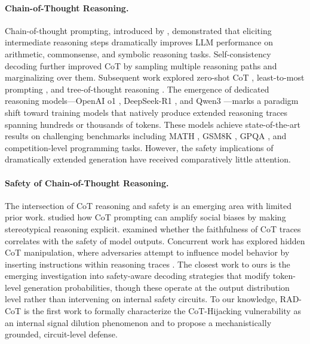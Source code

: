 \documentclass[11pt]{article}
\begin{document}
\paragraph{Chain-of-Thought Reasoning.}
Chain-of-thought prompting, introduced by \citet{wei2022chain}, demonstrated that eliciting intermediate reasoning steps dramatically improves LLM performance on arithmetic, commonsense, and symbolic reasoning tasks. Self-consistency decoding \citep{wang2023selfconsistency} further improved CoT by sampling multiple reasoning paths and marginalizing over them. Subsequent work explored zero-shot CoT \citep{kojima2022large}, least-to-most prompting \citep{zhou2023leasttomost}, and tree-of-thought reasoning \citep{yao2024tree}. The emergence of dedicated reasoning models---OpenAI o1 \citep{openai2024o1}, DeepSeek-R1 \citep{deepseekai2025deepseekr1}, and Qwen3 \citep{qwen2025qwen3}---marks a paradigm shift toward training models that natively produce extended reasoning traces spanning hundreds or thousands of tokens. These models achieve state-of-the-art results on challenging benchmarks including MATH \citep{hendrycks2021measuring}, GSM8K \citep{cobbe2021gsm8k}, GPQA \citep{rein2024gpqa}, and competition-level programming tasks. However, the safety implications of dramatically extended generation have received comparatively little attention.

\paragraph{Safety of Chain-of-Thought Reasoning.}
The intersection of CoT reasoning and safety is an emerging area with limited prior work. \citet{shaikh2023second} studied how CoT prompting can amplify social biases by making stereotypical reasoning explicit. \citet{wang2024chainofthought} examined whether the faithfulness of CoT traces correlates with the safety of model outputs. Concurrent work has explored hidden CoT manipulation, where adversaries attempt to influence model behavior by inserting instructions within reasoning traces \citep{roger2023preventing, xu2024preemptive}. The closest work to ours is the emerging investigation into safety-aware decoding strategies \citep{xu2024safedecoding} that modify token-level generation probabilities, though these operate at the output distribution level rather than intervening on internal safety circuits. To our knowledge, RAD-CoT is the first work to formally characterize the CoT-Hijacking vulnerability as an internal signal dilution phenomenon and to propose a mechanistically grounded, circuit-level defense.
\end{document}
